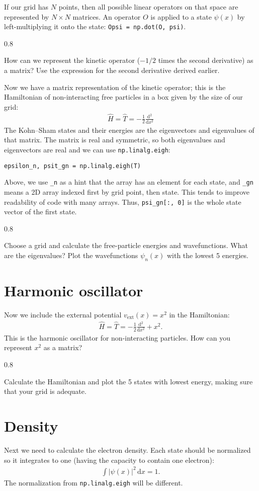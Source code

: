 \documentclass{article}
\newcommand{\exercise}[1]{
  \bigskip
  \begin{boxedminipage}[c]{0.8\linewidth}
  #1
  \end{boxedminipage}
  \bigskip
}
\newcommand{\dee}[0]{\mathrm d}
\newcommand{\idee}[0]{\,\dee}
\newcommand{\diff}[2]{\frac{\dee #1}{\dee #2}}
\begin{document}
If our grid has $N$ points, then all possible linear operators on that
space are represented by $N\times N$ matrices.  An operator $O$ is
applied to a state $\psi(x)$ by left-multiplying it onto the state:
\texttt{Opsi = np.dot(O, psi)}.

\exercise{
How can we represent the kinetic operator ($-1/2$ times the second derivative)
as a matrix?  Use the expression
for the second derivative derived earlier.
}

\noindent Now we have a matrix representation of the kinetic operator; this
is the Hamiltonian of non-interacting free particles in a box given by
the size of our grid:
\begin{align}
  \hat H = \hat T = -\frac12 \diff{^2}{x^2}
\end{align}
The Kohn--Sham states and their energies are the eigenvectors and
eigenvalues of that matrix.  The matrix is real and symmetric, so both eigenvalues and eigenvectors are real and we can use
\texttt{np.linalg.eigh}:
\begin{lstlisting}
epsilon_n, psit_gn = np.linalg.eigh(T)
\end{lstlisting}
Above, we use \lstinline{_n} as a hint that the array has an element for each
state,
and \lstinline{_gn} means a 2D array indexed first by grid point, then state.
This tends to improve readability of code with many arrays.
Thus, \lstinline{psi_gn[:, 0]} is the whole state vector of the first state.

\exercise{
  Choose a grid and calculate the free-particle energies and wavefunctions.
  What are the eigenvalues?
  Plot the wavefunctions $\psi_n(x)$ with the lowest 5 energies.
}

\section{Harmonic oscillator}
Now we include the external potential $v_{\mathrm{ext}}(x) = x^2$ in the Hamiltonian:
\begin{align}
  \hat H = \hat T = -\frac12 \diff{^2}{x^2} + x^2.
\end{align}
This is the harmonic oscillator for non-interacting particles.
How can you represent $x^2$ as a matrix?


\exercise{
Calculate the Hamiltonian and plot the 5 states with lowest energy,
making sure that your grid is adequate.
}

\section{Density}
Next we need to calculate the electron density.
Each state should be normalized so it integrates to one (having the
capacity to contain one electron):
\begin{align}
  \int |\psi(x)|^2 \idee x = 1.
\end{align}
The normalization from \texttt{np.linalg.eigh} will be different.
\end{document}
